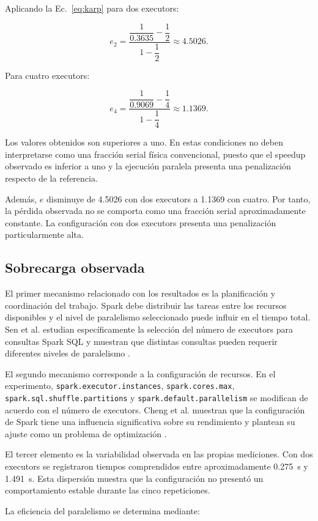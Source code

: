 \documentclass[12pt,a4paper]{article}
\begin{document}
Aplicando la Ec.~\eqref{eq:karp} para dos executors:

\[
e_2=
\frac{
\dfrac{1}{0.3635}
-
\dfrac{1}{2}
}
{
1-\dfrac{1}{2}
}
\approx
4.5026.
\]

Para cuatro executors:

\[
e_4=
\frac{
\dfrac{1}{0.9069}
-
\dfrac{1}{4}
}
{
1-\dfrac{1}{4}
}
\approx
1.1369.
\]

Los valores obtenidos son superiores a uno. En estas condiciones no deben
interpretarse como una fracción serial física convencional, puesto que el
speedup observado es inferior a uno y la ejecución paralela presenta una
penalización respecto de la referencia.

Además, $e$ disminuye de \num{4.5026} con dos executors a \num{1.1369} con
cuatro. Por tanto, la pérdida observada no se comporta como una fracción serial
aproximadamente constante. La configuración con dos executors presenta una
penalización particularmente alta.

\subsection{Sobrecarga observada}

El primer mecanismo relacionado con los resultados es la planificación y
coordinación del trabajo. Spark debe distribuir las tareas entre los recursos
disponibles y el nivel de paralelismo seleccionado puede influir en el tiempo
total. Sen et al. estudian específicamente la selección del número de
executors para consultas Spark SQL y muestran que distintas consultas pueden
requerir diferentes niveles de paralelismo \cite{sen2021}.

El segundo mecanismo corresponde a la configuración de recursos. En el
experimento, \texttt{spark.executor.instances},
\texttt{spark.cores.max},
\texttt{spark.sql.shuffle.partitions} y
\texttt{spark.default.parallelism} se modifican de acuerdo con el número de
executors. Cheng et al. muestran que la configuración de Spark tiene una
influencia significativa sobre su rendimiento y plantean su ajuste como un
problema de optimización \cite{cheng2021}.

El tercer elemento es la variabilidad observada en las propias mediciones. Con
dos executors se registraron tiempos comprendidos entre aproximadamente
\SI{0.275}{\second} y \SI{1.491}{\second}. Esta dispersión muestra que la
configuración no presentó un comportamiento estable durante las cinco
repeticiones.

La eficiencia del paralelismo se determina mediante:
\end{document}
